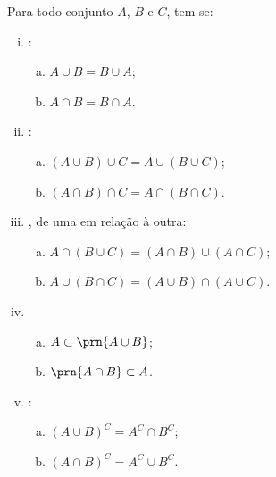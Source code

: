 \begin{proposition}
\label{prop:uniao-e-intersecao}
Para todo conjunto $A$, $B$ e $C$, tem-se:
\begin{enumerate}[i)]
\item {}: 
	\begin{enumerate}[a)]
		\item $A \cup B = B \cup A$;
		\item $A \cap B = B \cap A$.
	\end{enumerate}
\item {}:
	\begin{enumerate}[a)]
		\item $\left(A \cup B \right) \cup C = A \cup \left( B \cup C \right)$;
		\item $\left(A \cap B \right) \cap C = A \cap \left( B \cap C \right)$.
	\end{enumerate}
\item {}, de uma em relação à outra:
	\begin{enumerate}[a)]
		\item $A \cap \left( B \cup C \right) = \left(A \cap B \right) \cup \left( A \cap C \right)$;
		\item $A \cup \left( B \cap C \right) = \left(A \cup B \right) \cap \left( A \cup C  \right)$.
	\end{enumerate}
\item %
	\begin{enumerate}[a)]
		\item $A \subset \prn{A \cup B}$;
		\item $\prn{A \cap B} \subset A$.
	\end{enumerate}
\item
	:
	\begin{enumerate}[a)]
		\item $\left( A \cup B \right)^C = A^C \cap B^C$;
		\item $\left(A \cap B \right)^C = A^C \cup B^C$.
	\end{enumerate}
\end{enumerate}
\end{proposition}

